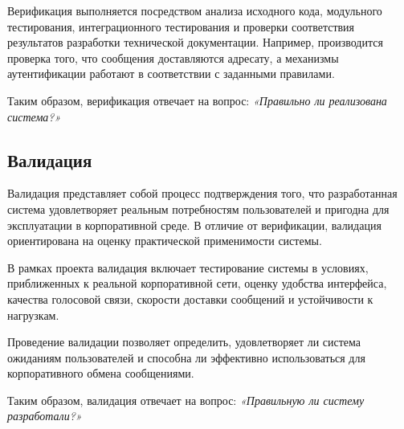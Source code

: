 \documentclass[14pt,a4paper]{extarticle}
\begin{document}
Верификация выполняется посредством анализа исходного кода, модульного тестирования, интеграционного тестирования и проверки соответствия результатов разработки технической документации. Например, производится проверка того, что сообщения доставляются адресату, а механизмы аутентификации работают в соответствии с заданными правилами.

Таким образом, верификация отвечает на вопрос: \textit{«Правильно ли реализована система?»}

\subsection{Валидация}

Валидация представляет собой процесс подтверждения того, что разработанная система удовлетворяет реальным потребностям пользователей и пригодна для эксплуатации в корпоративной среде. В отличие от верификации, валидация ориентирована на оценку практической применимости системы.

В рамках проекта валидация включает тестирование системы в условиях, приближенных к реальной корпоративной сети, оценку удобства интерфейса, качества голосовой связи, скорости доставки сообщений и устойчивости к нагрузкам.

Проведение валидации позволяет определить, удовлетворяет ли система ожиданиям пользователей и способна ли эффективно использоваться для корпоративного обмена сообщениями.

Таким образом, валидация отвечает на вопрос: \textit{«Правильную ли систему разработали?»}
\end{document}
